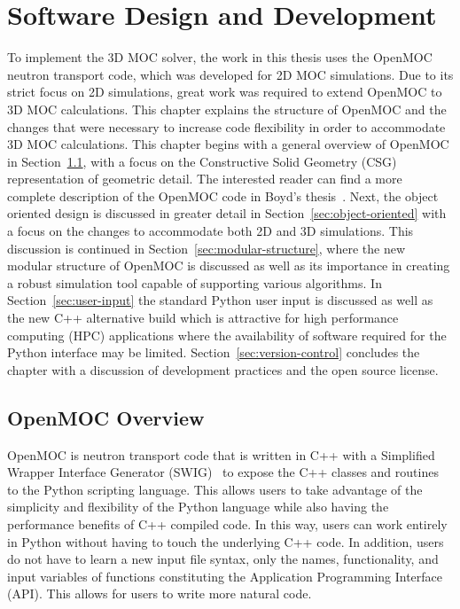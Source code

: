 \chapter{Software Design and Development}
\label{chap:software-design}

To implement the 3D MOC solver, the work in this thesis uses the OpenMOC~\cite{openmoc} neutron transport code, which was developed for 2D MOC simulations. Due to its strict focus on 2D simulations, great work was required to extend OpenMOC to 3D MOC calculations. This chapter explains the structure of OpenMOC and the changes that were necessary to increase code flexibility in order to accommodate 3D MOC calculations. This chapter begins with a general overview of OpenMOC in Section~\ref{sec:openmoc-overview}, with a focus on the Constructive Solid Geometry (CSG) representation of geometric detail. The interested reader can find a more complete description of the OpenMOC code in Boyd's thesis~\cite{boyd2014openmoc}. Next, the object oriented design is discussed in greater detail in Section~\ref{sec:object-oriented} with a focus on the changes to accommodate both 2D and 3D simulations. This discussion is continued in Section~\ref{sec:modular-structure}, where the new modular structure of OpenMOC is discussed as well as its importance in creating a robust simulation tool capable of supporting various algorithms. In Section~\ref{sec:user-input} the standard Python user input is discussed as well as the new C++ alternative build which is attractive for high performance computing (HPC) applications where the availability of software required for the Python interface may be limited. Section~\ref{sec:version-control} concludes the chapter with a discussion of development practices and the open source license.

\section{OpenMOC Overview}
\label{sec:openmoc-overview}

OpenMOC is neutron transport code that is written in C++ with a Simplified Wrapper Interface Generator (SWIG)~\cite{swig} to expose the C++ classes and routines to the Python scripting language. This allows users to take advantage of the simplicity and flexibility of the Python language while also having the performance benefits of C++ compiled code. In this way, users can work entirely in Python without having to touch the underlying C++ code. In addition, users do not have to learn a new input file syntax, only the names, functionality, and input variables of functions constituting the Application Programming Interface (API). This allows for users to write more natural code.

